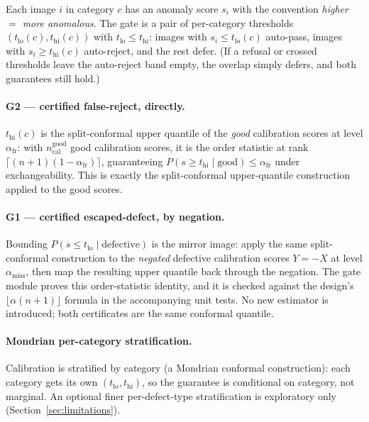 \documentclass[11pt]{article}
\begin{document}
Each image $i$ in category $c$ has an anomaly score $s_i$ with the convention \emph{higher
$=$ more anomalous}. The gate is a pair of per-category thresholds $(t_{\text{lo}}(c),
t_{\text{hi}}(c))$ with $t_{\text{lo}} \le t_{\text{hi}}$: images with $s_i \le t_{\text{lo}}(c)$
auto-pass, images with $s_i \ge t_{\text{hi}}(c)$ auto-reject, and the rest defer. (If a refusal or
crossed thresholds leave the auto-reject band empty, the overlap simply defers, and both guarantees
still hold.)

\paragraph{G2 --- certified false-reject, directly.} $t_{\text{hi}}(c)$ is the split-conformal
upper quantile of the \emph{good} calibration scores at level $\alpha_{\text{fr}}$: with
$n_{\text{cal}}^{\text{good}}$ good calibration scores, it is the order statistic at rank
$\lceil (n+1)(1-\alpha_{\text{fr}}) \rceil$, guaranteeing $P(s \ge t_{\text{hi}} \mid \text{good})
\le \alpha_{\text{fr}}$ under exchangeability. This is exactly the split-conformal upper-quantile
construction applied to the good scores.

\paragraph{G1 --- certified escaped-defect, by negation.} Bounding
$P(s \le t_{\text{lo}} \mid \text{defective})$ is the mirror image: apply the same split-conformal
construction to the \emph{negated} defective calibration scores $Y=-X$ at level
$\alpha_{\text{miss}}$, then map the resulting upper quantile back through the negation. The gate
module proves this order-statistic identity, and it is checked against the design's
$\lfloor \alpha(n+1)\rfloor$ formula in the accompanying unit tests. No new
estimator is introduced; both certificates are the same conformal quantile.

\paragraph{Mondrian per-category stratification.} Calibration is stratified by category (a Mondrian
conformal construction): each category gets its own $(t_{\text{lo}}, t_{\text{hi}})$, so the
guarantee is conditional on category, not marginal. An optional finer per-defect-type
stratification is exploratory only (Section~\ref{sec:limitations}).
\end{document}
